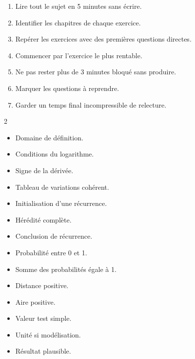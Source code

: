 \documentclass[11pt,a4paper]{article}
\begin{document}
\begin{methode}
\begin{enumerate}
  \item Lire tout le sujet en 5 minutes sans écrire.
  \item Identifier les chapitres de chaque exercice.
  \item Repérer les exercices avec des premières questions directes.
  \item Commencer par l'exercice le plus rentable.
  \item Ne pas rester plus de 3 minutes bloqué sans produire.
  \item Marquer les questions à reprendre.
  \item Garder un temps final incompressible de relecture.
\end{enumerate}
\end{methode}

\begin{methode}
\begin{multicols}{2}
\begin{itemize}
  \item Domaine de définition.
  \item Conditions du logarithme.
  \item Signe de la dérivée.
  \item Tableau de variations cohérent.
  \item Initialisation d'une récurrence.
  \item Hérédité complète.
  \item Conclusion de récurrence.
  \item Probabilité entre 0 et 1.
  \item Somme des probabilités égale à 1.
  \item Distance positive.
  \item Aire positive.
  \item Valeur test simple.
  \item Unité si modélisation.
  \item Résultat plausible.
\end{itemize}
\end{multicols}
\end{methode}
\end{document}
